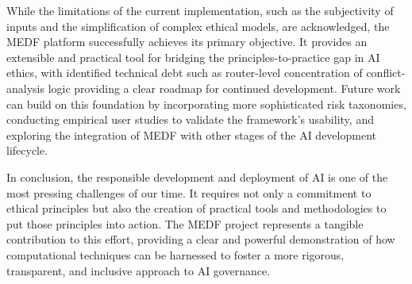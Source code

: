 While the limitations of the current implementation, such as the subjectivity of inputs and the simplification of complex ethical models, are acknowledged, the MEDF platform successfully achieves its primary objective. It provides an extensible and practical tool for bridging the principles-to-practice gap in AI ethics, with identified technical debt such as router-level concentration of conflict-analysis logic providing a clear roadmap for continued development. Future work can build on this foundation by incorporating more sophisticated risk taxonomies, conducting empirical user studies to validate the framework's usability, and exploring the integration of MEDF with other stages of the AI development lifecycle.

In conclusion, the responsible development and deployment of AI is one of the most pressing challenges of our time. It requires not only a commitment to ethical principles but also the creation of practical tools and methodologies to put those principles into action. The MEDF project represents a tangible contribution to this effort, providing a clear and powerful demonstration of how computational techniques can be harnessed to foster a more rigorous, transparent, and inclusive approach to AI governance.
